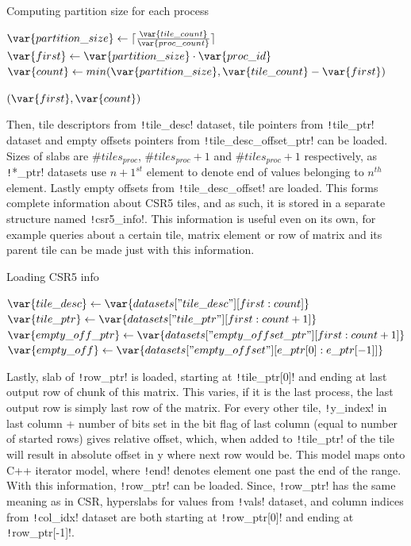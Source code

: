 \documentclass[thesis=M,english]{FITthesis}[2019/12/23]
\newcommand{\csre}[1]{\texttt!#1!}
\begin{document}
\begin{algorithm}
    \caption{Computing partition size for each process}
    \begin{algorithmic}
        \State $\var{partition\_size} \gets \lceil\frac{\var{tile\_count}}{\var{proc\_count}}\rceil$
        \State \(\var{first} \gets \var{partition\_size} \cdot \var{proc\_id}\)
        \State $\var{count} \gets min(\var{partition\_size}, \var{tile\_count} - \var{first})$

        \Return $(\var{first}, \var{count})$
        \EndFunction
    \end{algorithmic}
\end{algorithm}

Then, tile descriptors from \csre{tile_desc} dataset, tile pointers from \csre{tile_ptr}
dataset and empty offsets pointers from \csre{tile_desc_offset_ptr} can be loaded.
Sizes of slabs are $\#tiles_{proc}$, $\#tiles_{proc} + 1$ and $\#tiles_{proc} + 1$
respectively, as \csre{*_ptr} datasets use $n+1^{st}$ element to denote end of values
belonging to $n^{th}$ element. Lastly empty offsets from \csre{tile_desc_offset}
are loaded. This forms complete information about CSR5 tiles, and as such, it is
stored in a separate structure named \csre{csr5_info}. This information is useful
even on its own, for example queries about a certain tile, matrix element or row
of matrix and its parent tile can be made just with this information.

\begin{algorithm}
    \caption{Loading CSR5 info}
    \begin{algorithmic}
        \State $\var{tile\_desc} \gets \var{datasets["tile\_desc"][first:count]}$
        \State $\var{tile\_ptr} \gets \var{datasets["tile\_ptr"][first:count+1]}$
        \State $\var{empty\_off\_ptr} \gets \var{datasets["empty\_offset\_ptr"][first:count+1]}$
        \State $\var{empty\_off} \gets \var{datasets["empty\_offset"][e\_ptr[0]:e\_ptr[-1]]}$
        \EndFunction
    \end{algorithmic}
\end{algorithm}

Lastly, slab of \csre{row_ptr} is loaded, starting at \csre{tile_ptr[0]} and
ending at last output row of chunk of this matrix. This varies, if it is the last
process, the last output row is simply last row of the matrix. For every other tile,
\csre{y_index} in last column + number of bits set in the bit flag of last column
(equal to number of started rows) gives relative offset, which, when added to
\csre{tile_ptr} of the tile will result in absolute offset in y where next row would be.
This model maps onto C++ iterator model, where \csre{end} denotes
element one past the end of the range. With this information, \csre{row_ptr} can be
loaded. Since, \csre{row_ptr} has the same meaning as in CSR, hyperslabs for
values from \csre{vals} dataset, and column indices from \csre{col_idx} dataset
are both starting at \csre{row_ptr[0]} and ending at \csre{row_ptr[-1]}.
\end{document}

